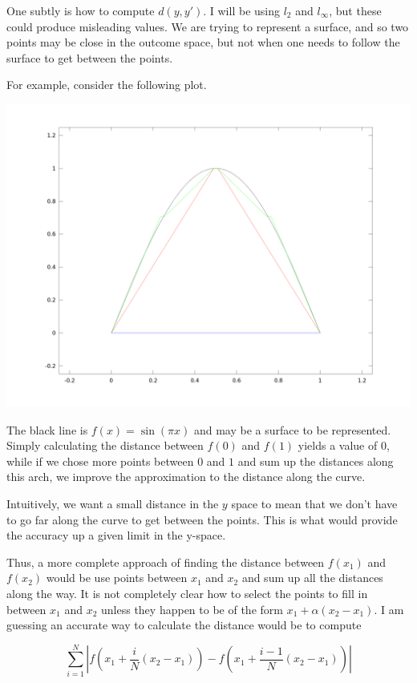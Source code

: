 \documentclass{article}
\begin{document}
One subtly is how to compute $d(y, y')$. I will be using $l_2$ and $l_{\infty}$, but these could produce misleading values.
We are trying to represent a surface, and so two points may be close in the outcome space, but not when one needs to follow the surface to get between the points.

For example, consider the following plot.

\includegraphics[scale=.17]{aplot.png}

The black line is $f(x) = \sin(\pi x)$ and may be a surface to be represented.
Simply calculating the distance between $f(0)$ and $f(1)$ yields a value of $0$, while if we chose more points between $0$ and $1$ and sum up the distances along this arch,
we improve the approximation to the distance along the curve.

Intuitively, we want a small distance in the $y$ space to mean that we don't have to go far along the curve to get between the points.
This is what would provide the accuracy up a given limit in the y-space.

Thus, a more complete approach of finding the distance between $f(x_1)$ and $f(x_2)$ would be use points between $x_1$ and $x_2$ and sum up all the distances along the way.
It is not completely clear how to select the points to fill in between $x_1$ and $x_2$ unless they happen to be of the form $x_1 + \alpha (x_2 - x_1)$.
I am guessing an accurate way to calculate the distance would be to compute 

$$\sum^N_{i=1}   |f(x_1 + \frac i N (x_2 - x_1)) - f(x_1 + \frac{i-1}{ N} (x_2 - x_1))| $$
\end{document}
